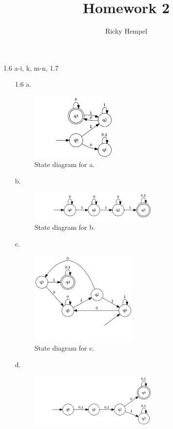\documentclass[10pt] {article}
\title{Homework 2 }
\author{Ricky Hempel}
\begin{document}
\maketitle
\begin{center}
1.6 a-i, k, m-n, 1.7
\end{center}
\begin{enumerate}
\item[1.6]
a.
\begin{figure}[H]
\includegraphics[width=0.4\textwidth]{a6.png}
\caption{ State diagram for a.}
\label{8}
\end{figure} 
b.
\begin{figure}[H]
\includegraphics[width=0.6\textwidth]{b6.png}
\caption{State diagram for b.}
\label{8}
\end{figure} 
c.
\begin{figure}[H]
\includegraphics[width=0.5\textwidth]{c6.png}
\caption{State diagram for c.}
\label{8}
\end{figure} 
d.
\begin{figure}[H]
\includegraphics[width=0.6\textwidth]{d6.png}

\end{figure}
\end{enumerate}
\end{document}
